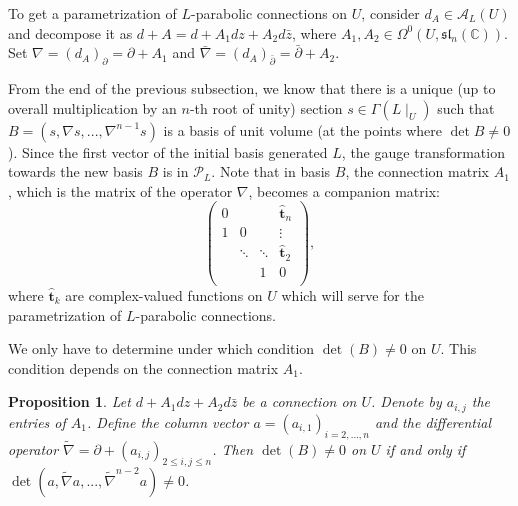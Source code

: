 \documentclass[11pt]{amsart}
\newtheorem{prop}[thm]{Proposition}
\numberwithin{thm}{section} %
\numberwithin{equation}{section} %
\numberwithin{figure}{section} %
\newcommand*{\C}{\mathbb{C}}
\newcommand*{\mc}{\mathcal}
\begin{document}
To get a parametrization of $L$-parabolic connections on $U$, consider $d_A\in \mathcal{A}_L(U)$ and decompose it as $d+A=d+A_1dz + A_2d\bar{z}$, where $A_1, A_2\in \Omega^0(U,\mathfrak{sl}_n(\C))$. Set $\nabla = (d_A)_{\partial} = \partial + A_1$ and $\bar{\nabla} = (d_A)_{\bar\partial}= \bar{\partial}+ A_2$.

From the end of the previous subsection, we know that there is a unique (up to overall multiplication by an $n$-th root of unity) section $s\in\Gamma(L\!\mid_U)$ such that $B=(s,\nabla s,...,\nabla^{n-1}s)$ is a basis of unit volume (at the points where $\det B\neq 0$). Since the first vector of the initial basis generated $L$, the gauge transformation towards the new basis $B$ is in $\mc{P}_L$. 
Note that in basis $B$, the connection matrix $A_1$, which is the matrix of the operator $\nabla$, becomes a companion matrix:
\begin{equation}\label{firstmatrix}
\begin{pmatrix} 
0&  &  & \bm\hat{t}_n\\
1 &0   &  &\vdots \\
& \ddots &\ddots &\bm\hat{t}_2 \\
 &  & 1 & 0 \\
\end{pmatrix},
\end{equation}
where $\bm\hat{t}_k$ are complex-valued functions on $U$ which will serve for the parametrization of $L$-parabolic connections.

We only have to determine under which condition $\det(B)\neq 0$ on $U$. This condition depends on the connection matrix $A_1$.

\begin{prop}\label{existence-para-gauge}
Let $d+A_1dz+A_2d\bar{z}$ be a connection on $U$. Denote by $a_{i,j}$ the entries of $A_1$. Define the column vector $a=(a_{i,1})_{i=2,...,n}$ and the differential operator $\widetilde{\nabla}=\partial+(a_{i,j})_{2\leq i,j\leq n}$. Then $\det(B)\neq 0$ on $U$ if and only if $\det(a,\widetilde{\nabla}a,...,\widetilde{\nabla}^{n-2}a)\neq 0$.
\end{prop}
\end{document}

